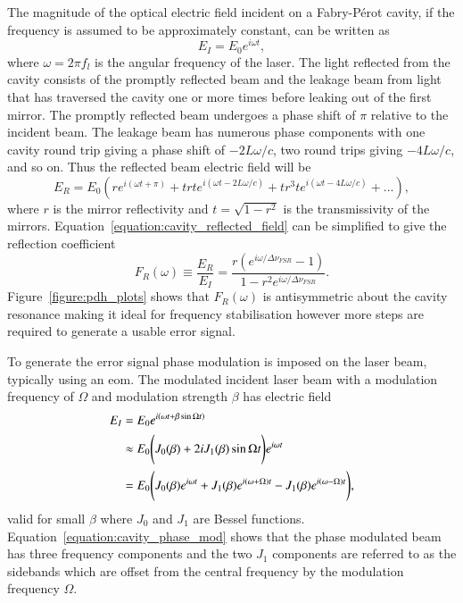 The magnitude of the optical electric field incident on a Fabry-P\'erot cavity, if the frequency is assumed to be approximately constant, can be written as
\begin{equation}
E_{I} = E_0 e^{i\omega t},
\end{equation}
where $\omega=2\pi f_l$ is the angular frequency of the laser.
The light reflected from the cavity consists of the promptly reflected beam and the leakage beam from light that has traversed the cavity one or more times before leaking out of the first mirror.
The promptly reflected beam undergoes a phase shift of $\pi$ relative to the incident beam.
The leakage beam has numerous phase components with one cavity round trip giving a phase shift of $-2L\omega/c$, two round trips giving $-4L\omega/c$, and so on.
Thus the reflected beam electric field will be
\begin{equation}\label{equation:cavity_reflected_field}
E_R = E_0 \left( r e^{i\left(\omega t + \pi\right)} + t r t e^{i\left(\omega t -2L\omega/c\right)} + t r^3 t e^{i\left(\omega t -4L\omega/c\right)} + ...\right),
\end{equation}
where $r$ is the mirror reflectivity and $t=\sqrt{1-r^2}$ is the transmissivity of the mirrors.
Equation~\ref{equation:cavity_reflected_field} can be simplified to give the reflection coefficient
\begin{equation}\label{equation:reflection_coefficient}
F_R(\omega) \equiv \frac{E_R}{E_I} = \frac{r\left(e^{i\omega / \Delta\nu_{FSR}} - 1 \right)}{1-r^2 e^{i\omega / \Delta\nu_{FSR}}}.
\end{equation}
Figure~\ref{figure:pdh_plots} shows that $F_R(\omega)$ is antisymmetric about the cavity resonance making it ideal for frequency stabilisation however more steps are required to generate a usable error signal.

To generate the error signal phase modulation is imposed on the laser beam, typically using an \gls{eom}.
The modulated incident laser beam with a modulation frequency of $\Omega$ and modulation strength $\beta$ has electric field
\begin{align}
E_I &= E_0 e^{i\left(\omega t + \beta \sin\Omega t \right)} \notag \\
&\approx E_0 \Bigg( J_0(\beta) + 2iJ_1(\beta)\sin\Omega t \Bigg)e^{i\omega t} \notag \\
&= E_0 \Bigg( J_0(\beta)e^{i\omega t} + J_1(\beta)e^{i(\omega + \Omega)t} - J_1(\beta)e^{i(\omega - \Omega)t} \Bigg),\label{equation:cavity_phase_mod}
\end{align}
valid for small $\beta$ where $J_0$ and $J_1$ are Bessel functions.
Equation~\ref{equation:cavity_phase_mod} shows that the phase modulated beam has three frequency components and the two $J_1$ components are referred to as the sidebands which are offset from the central frequency by the modulation frequency $\Omega$.

